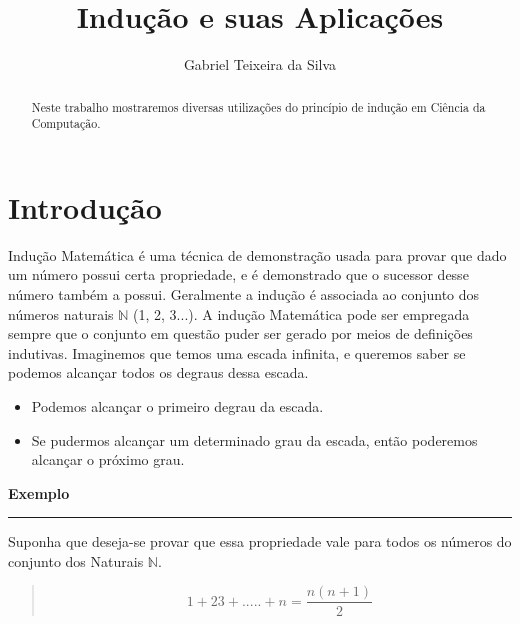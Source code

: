 \documentclass[a4paper, 10pt]{article}
\title{\LARGE \bf
 Indução e suas Aplicações
}
\author{Gabriel Teixeira da Silva}
\begin{document}
\maketitle

\begin{abstract}

Neste trabalho mostraremos diversas utilizações do princípio de indução em Ciência da Computação.

\end{abstract}

\section{Introdução}
Indução Matemática é uma técnica de demonstração usada para provar que dado um número possui certa propriedade, e é demonstrado que o sucessor desse número também a possui. Geralmente a indução é associada ao conjunto dos números naturais $\mathbb{N}$ (1, 2, 3...). A indução Matemática pode ser empregada sempre que o conjunto em questão puder ser gerado por meios de definições indutivas.
Imaginemos que temos uma escada infinita, e queremos saber se podemos alcançar todos os degraus dessa escada.
\begin{itemize}
\item Podemos alcançar o primeiro degrau da escada.
\item Se pudermos alcançar um determinado grau da escada, então poderemos alcançar o próximo grau.
\end{itemize}
\begin{description}
\item \textbf{Exemplo}
  \hrule
\end{description}
Suponha que deseja-se provar que essa propriedade vale para todos os números do conjunto dos Naturais $\mathbb{N}$.
\begin{quote}
  \[1 + 2 3 +.....+ n = \frac{n(n + 1)}{2}\]
\end{quote}
\end{document}
